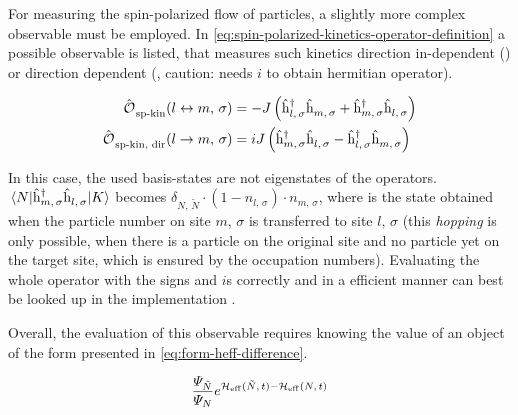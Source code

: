 
For measuring the spin-polarized flow of particles, a slightly more complex observable must be employed. 
In \autoref{eq:spin-polarized-kinetics-operator-definition} a possible observable is listed, that measures such kinetics direction in-dependent () or direction dependent (, caution: needs $i$ to obtain hermitian operator).

\begin{equation}
    \label{eq:spin-polarized-kinetics-operator-definition}
    \begin{split}
        \spinPolarizedKineticsOperator{l}{m}{\sigma} &= - J \left(\withspinhcop{l}{\sigma}{\dagger}\withspinhcop{m}{\sigma}{} + \withspinhcop{m}{\sigma}{\dagger}\withspinhcop{l}{\sigma}{}\right)\\
        \spinPolarizedKineticsOperatorDir{l}{m}{\sigma} &= i J \left(\withspinhcop{m}{\sigma}{\dagger}\withspinhcop{l}{\sigma}{} - \withspinhcop{l}{\sigma}{\dagger}\withspinhcop{m}{\sigma}{}\right)\\
    \end{split}
\end{equation}

In this case, the used basis-states are not eigenstates of the operators. 
$\bracketHelper{N}{\withspinhcop{m}{\sigma}{\dagger}\withspinhcop{l}{\sigma}{}}{K}$ becomes $\delta_{N,\,\tilde{N}}\cdot (1-n_{l,\,\sigma} )\cdot n_{m,\,\sigma}$, where  is the state obtained when the particle number on site $m,\, \sigma$ is transferred to site $l,\, \sigma$ (this \emph{hopping} is only possible, when there is a particle on the original site and no particle yet on the target site, which is ensured by the occupation numbers).
Evaluating the whole operator with the signs and $i$s correctly and in a efficient manner can best be looked up in the implementation .

Overall, the evaluation of this observable requires knowing the value of an object of the form presented in \autoref{eq:form-heff-difference}.

\begin{equation}
    \label{eq:form-heff-difference}
    \frac{\psiN[\tilde{N}]}{\psiN} e^{\HeffOft[\tilde{N}]-\HeffOft[N]}
\end{equation}

